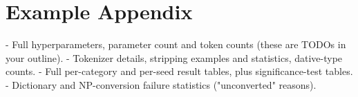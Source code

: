 \documentclass[11pt]{article}
\begin{document}

%



\appendix

\section{Example Appendix}
\label{sec:appendix}

- Full hyperparameters, parameter count and token counts (these are TODOs in your outline).
- Tokenizer details, stripping examples and statistics, dative-type counts.
- Full per-category and per-seed result tables, plus significance-test tables.
- Dictionary and NP-conversion failure statistics ("unconverted" reasons).
\end{document}
